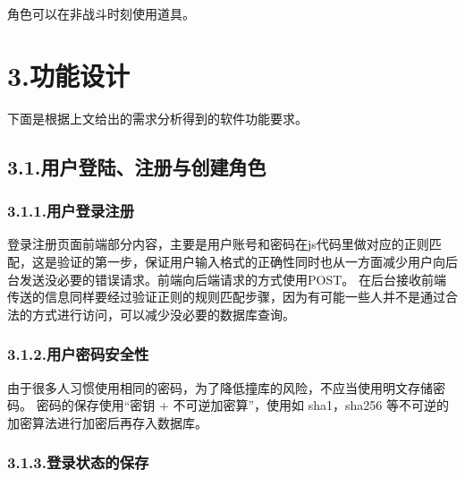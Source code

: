 \documentclass{article}
\begin{document}
\noindent{}角色可以在非战斗时刻使用道具。%

\section{3.\hspace*{0.5em}功能设计}\label{3}%

\noindent{}下面是根据上文给出的需求分析得到的软件功能要求。%

\subsection{3.1.\hspace*{0.5em}用户登陆、注册与创建角色}\label{31}%

\subsubsection{3.1.1.\hspace*{0.5em}用户登录注册}\label{311}%

\noindent{}登录注册页面前端部分内容，主要是用户账号和密码在js代码里做对应的正则匹配，这是验证的第一步，保证用户输入格式的正确性同时也从一方面减少用户向后台发送没必要的错误请求。前端向后端请求的方式使用POST。 在后台接收前端传送的信息同样要经过验证正则的规则匹配步骤，因为有可能一些人并不是通过合法的方式进行访问，可以减少没必要的数据库查询。%

\subsubsection{3.1.2.\hspace*{0.5em}用户密码安全性}\label{312}%

\noindent{}由于很多人习惯使用相同的密码，为了降低撞库的风险，不应当使用明文存储密码。 密码的保存使用“密钥 + 不可逆加密算”，使用如 sha1，sha256 等不可逆的加密算法进行加密后再存入数据库。%

\subsubsection{3.1.3.\hspace*{0.5em}登录状态的保存}\label{313}%
\end{document}
